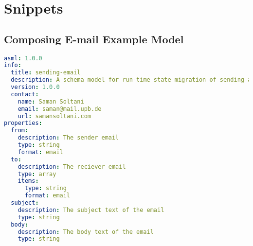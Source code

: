 \chapter{Snippets} 

\label{appendix:compose-email-schema}
\section{Composing E-mail Example Model}
\lstset{
  label=lis:sending-email-schema, caption=Composing E-mail model as JSON Schema in YAML., 
  basicstyle=\ttfamily\footnotesize, frame=single, captionpos=b,
  xleftmargin=.01\textwidth, xrightmargin=.01\textwidth,
  breaklines=true
}
\begin{lstlisting}[language=yaml]
asml: 1.0.0
info:
  title: sending-email
  description: A schema model for run-time state migration of sending an email
  version: 1.0.0
  contact:
    name: Saman Soltani
    email: saman@mail.upb.de
    url: samansoltani.com
properties:
  from:
    description: The sender email
    type: string
    format: email
  to:
    description: The reciever email
    type: array
    items:
      type: string
      format: email
  subject:
    description: The subject text of the email
    type: string
  body:
    description: The body text of the email
    type: string
\end{lstlisting}


